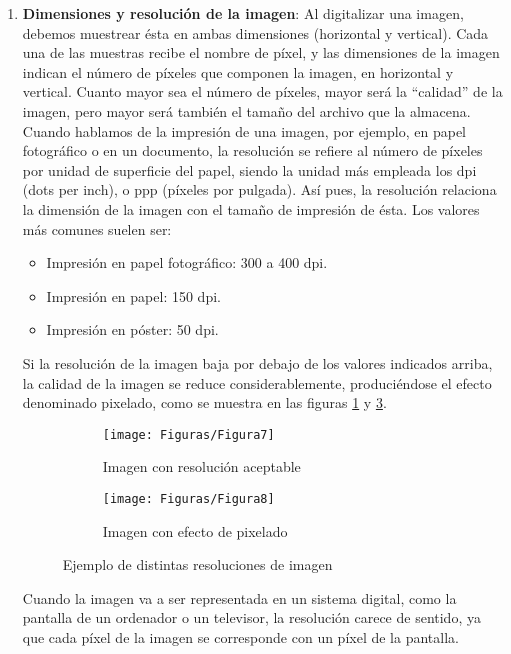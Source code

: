 \documentclass[es,practica]{uah}
\begin{document}
\begin{enumerate}
	\item {\bf Dimensiones y resolución de la imagen}: Al digitalizar una imagen, debemos muestrear ésta en ambas dimensiones (horizontal y vertical). Cada una de las muestras recibe el nombre de píxel, y las dimensiones de la imagen indican el número de píxeles que componen la imagen, en horizontal y vertical. Cuanto mayor sea el número de píxeles, mayor será la ``calidad'' de la imagen, pero mayor será también el tamaño del archivo que la almacena. Cuando hablamos de la impresión de una imagen, por ejemplo, en papel fotográfico o en un documento, la resolución se refiere al número de píxeles por unidad de superficie del papel, siendo la unidad más empleada los dpi (dots per inch), o ppp (píxeles por pulgada). Así pues, la resolución relaciona la dimensión de la imagen con el tamaño de impresión de ésta. Los valores más comunes suelen ser:
	\begin{itemize}
		\item Impresión en papel fotográfico: 300 a 400 dpi.
		\item Impresión en papel: 150 dpi.
		\item Impresión en póster: 50 dpi.
	\end{itemize}

	Si la resolución de la imagen baja por debajo de los valores indicados arriba, la calidad de la imagen se reduce considerablemente, produciéndose el efecto denominado pixelado, como se muestra en las figuras \ref{fig:fig7} y \ref{fig:fig8}.

\begin{figure}[h!]
	\centering
	\begin{subfigure}
	  \centering
	  \texttt{[image: Figuras/Figura7]}
	  \caption{Imagen con resolución aceptable}
	  \label{fig:fig7}
	\end{subfigure}
	\begin{subfigure}
	  \centering
	  \texttt{[image: Figuras/Figura8]}
	  \caption{Imagen con efecto de pixelado}
	  \label{fig:fig8}
	\end{subfigure}
	\caption{Ejemplo de distintas resoluciones de imagen}
	\end{figure}
	
	Cuando la imagen va a ser representada en un sistema digital, como la pantalla de un ordenador o un televisor, la resolución carece de sentido, ya que cada píxel de la imagen se corresponde con un píxel de la pantalla.
	

\end{enumerate}
\end{document}

